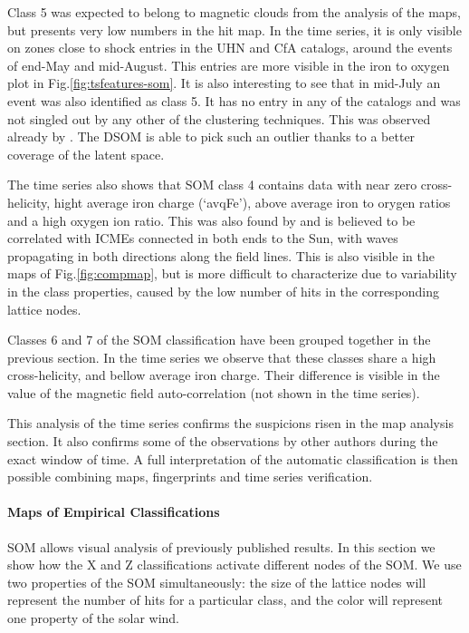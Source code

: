 Class 5 was expected to belong to magnetic clouds from the analysis of the maps, but presents very low numbers in the hit map. In the time series, it is only visible on zones close to shock entries in the UHN and CfA catalogs, around the events of end-May and mid-August. This entries are more visible in the iron to oxygen plot in Fig.\ref{fig:tsfeatures-som}. It is also interesting to see that in mid-July an event was also identified as class 5. It has no entry in any of the catalogs and was not singled out by any other of the clustering techniques. This was observed already by \citep{Roberts2020}. The DSOM is able to pick such an outlier thanks to a better coverage of the latent space.

The time series also shows that SOM class 4 contains data with near zero cross-helicity, hight average iron charge (`avqFe'), above average iron to orygen ratios and a high oxygen ion ratio. This was also found by \citep{Roberts2020} and is believed to be correlated with ICMEs connected in both ends to the Sun, with waves propagating in both directions along the field lines. This is also visible in the maps of Fig.\ref{fig:compmap}, but is more difficult to characterize due to variability in the class properties, caused by the low number of hits in the corresponding lattice nodes.

Classes 6 and 7 of the SOM classification have been grouped together in the previous section. In the time series we observe that these classes share a high cross-helicity, and bellow average iron charge. Their difference is visible in the value of the magnetic field auto-correlation (not shown in the time series).

This analysis of the time series confirms the suspicions risen in the map analysis section. It also confirms some of the observations by other authors during the exact window of time. A full interpretation of the automatic classification is then possible combining maps, fingerprints and time series verification.

\paragraph{Maps of Empirical Classifications}
SOM allows visual analysis of previously published results. In this section we show how the X and Z classifications activate different nodes of the SOM. We use two properties of the SOM simultaneously: the size of the lattice nodes will represent the number of hits for a particular class, and the color will represent one property of the solar wind.

